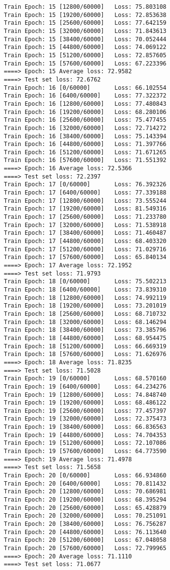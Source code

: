 \documentclass[11pt]{article}
\begin{document}
\begin{Verbatim}[commandchars=\\\{\}]
Train Epoch: 15 [12800/60000]   Loss: 75.803108
Train Epoch: 15 [19200/60000]   Loss: 72.853638
Train Epoch: 15 [25600/60000]   Loss: 77.642159
Train Epoch: 15 [32000/60000]   Loss: 71.843613
Train Epoch: 15 [38400/60000]   Loss: 70.052444
Train Epoch: 15 [44800/60000]   Loss: 74.069122
Train Epoch: 15 [51200/60000]   Loss: 72.857605
Train Epoch: 15 [57600/60000]   Loss: 67.223396
====> Epoch: 15 Average loss: 72.9582
====> Test set loss: 72.6762
Train Epoch: 16 [0/60000]       Loss: 66.102554
Train Epoch: 16 [6400/60000]    Loss: 77.322372
Train Epoch: 16 [12800/60000]   Loss: 77.480843
Train Epoch: 16 [19200/60000]   Loss: 68.280106
Train Epoch: 16 [25600/60000]   Loss: 75.477455
Train Epoch: 16 [32000/60000]   Loss: 72.714272
Train Epoch: 16 [38400/60000]   Loss: 75.143394
Train Epoch: 16 [44800/60000]   Loss: 71.397766
Train Epoch: 16 [51200/60000]   Loss: 71.671265
Train Epoch: 16 [57600/60000]   Loss: 71.551392
====> Epoch: 16 Average loss: 72.5366
====> Test set loss: 72.2397
Train Epoch: 17 [0/60000]       Loss: 76.392326
Train Epoch: 17 [6400/60000]    Loss: 77.339188
Train Epoch: 17 [12800/60000]   Loss: 73.555244
Train Epoch: 17 [19200/60000]   Loss: 81.549316
Train Epoch: 17 [25600/60000]   Loss: 71.233780
Train Epoch: 17 [32000/60000]   Loss: 71.538918
Train Epoch: 17 [38400/60000]   Loss: 71.460487
Train Epoch: 17 [44800/60000]   Loss: 68.403320
Train Epoch: 17 [51200/60000]   Loss: 71.029716
Train Epoch: 17 [57600/60000]   Loss: 65.840134
====> Epoch: 17 Average loss: 72.1952
====> Test set loss: 71.9793
Train Epoch: 18 [0/60000]       Loss: 75.502213
Train Epoch: 18 [6400/60000]    Loss: 73.839310
Train Epoch: 18 [12800/60000]   Loss: 74.992119
Train Epoch: 18 [19200/60000]   Loss: 73.201019
Train Epoch: 18 [25600/60000]   Loss: 68.710732
Train Epoch: 18 [32000/60000]   Loss: 68.146294
Train Epoch: 18 [38400/60000]   Loss: 73.385796
Train Epoch: 18 [44800/60000]   Loss: 68.954475
Train Epoch: 18 [51200/60000]   Loss: 66.669319
Train Epoch: 18 [57600/60000]   Loss: 71.626976
====> Epoch: 18 Average loss: 71.8235
====> Test set loss: 71.5028
Train Epoch: 19 [0/60000]       Loss: 68.570160
Train Epoch: 19 [6400/60000]    Loss: 64.234276
Train Epoch: 19 [12800/60000]   Loss: 74.848740
Train Epoch: 19 [19200/60000]   Loss: 68.486122
Train Epoch: 19 [25600/60000]   Loss: 77.457397
Train Epoch: 19 [32000/60000]   Loss: 72.375473
Train Epoch: 19 [38400/60000]   Loss: 66.836563
Train Epoch: 19 [44800/60000]   Loss: 74.704353
Train Epoch: 19 [51200/60000]   Loss: 72.107086
Train Epoch: 19 [57600/60000]   Loss: 64.773590
====> Epoch: 19 Average loss: 71.4978
====> Test set loss: 71.5658
Train Epoch: 20 [0/60000]       Loss: 66.934860
Train Epoch: 20 [6400/60000]    Loss: 70.811432
Train Epoch: 20 [12800/60000]   Loss: 70.686981
Train Epoch: 20 [19200/60000]   Loss: 68.395294
Train Epoch: 20 [25600/60000]   Loss: 65.428879
Train Epoch: 20 [32000/60000]   Loss: 70.251091
Train Epoch: 20 [38400/60000]   Loss: 76.756287
Train Epoch: 20 [44800/60000]   Loss: 76.113640
Train Epoch: 20 [51200/60000]   Loss: 67.048058
Train Epoch: 20 [57600/60000]   Loss: 72.799965
====> Epoch: 20 Average loss: 71.1110
====> Test set loss: 71.0677
    \end{Verbatim}
\end{document}
